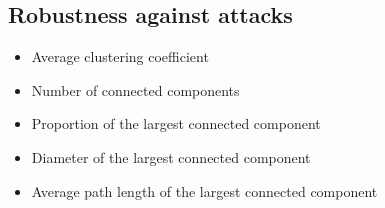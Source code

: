 \subsection{Robustness against attacks}

\begin{itemize}
	\item Average clustering coefficient
	\item Number of connected components
	\item Proportion of the largest connected component
	\item Diameter of the largest connected component
	\item Average path length of the largest connected component
\end{itemize}